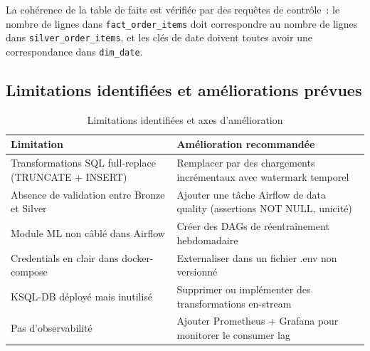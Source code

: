 La cohérence de la table de faits est vérifiée par des requêtes de contrôle~: le nombre de lignes dans \texttt{fact\_order\_items} doit correspondre au nombre de lignes dans \texttt{silver\_order\_items}, et les clés de date doivent toutes avoir une correspondance dans \texttt{dim\_date}.

\subsection{Limitations identifiées et améliorations prévues}

\begin{table}[H]
\centering
\begin{tabular}{p{5cm} p{8.5cm}}
\toprule
\textbf{Limitation} & \textbf{Amélioration recommandée} \\
\midrule
Transformations SQL full-replace (TRUNCATE + INSERT) & Remplacer par des chargements incrémentaux avec watermark temporel \\
Absence de validation entre Bronze et Silver & Ajouter une tâche Airflow de data quality (assertions NOT NULL, unicité) \\
Module ML non câblé dans Airflow & Créer des DAGs de réentraînement hebdomadaire \\
Credentials en clair dans docker-compose & Externaliser dans un fichier .env non versionné \\
KSQL-DB déployé mais inutilisé & Supprimer ou implémenter des transformations en-stream \\
Pas d'observabilité & Ajouter Prometheus + Grafana pour monitorer le consumer lag \\
\bottomrule
\end{tabular}
\caption{Limitations identifiées et axes d'amélioration}
\end{table}
